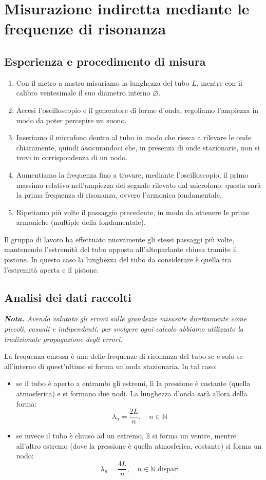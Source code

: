 \documentclass{article}
\newcommand*{\diam}{\varnothing}
\begin{document}
\pagebreak
\section{Misurazione indiretta mediante le frequenze di risonanza}

\subsection{Esperienza e procedimento di misura}

\begin{enumerate}
  \item
    Con il metro a nastro misuriamo la lunghezza del tubo $L$,
    mentre con il calibro ventesimale il suo diametro interno
    $\diam$.
  \item
    Accesi l'oscilloscopio e il generatore di forme d'onda,
    regoliamo l'ampiezza in modo da poter percepire un suono.
  \item
    Inseriamo il microfono dentro al tubo in modo che riesca a rilevare le onde
    chiaramente, quindi assicurandoci che, in presenza di onde stazionarie,
    non si trovi in corrispondenza di un nodo.
  \item
    Aumentiamo la frequenza fino a trovare, mediante l'oscilloscopio,
    il primo massimo relativo nell'ampiezza del segnale rilevato dal
    microfono: questa sarà la prima frequenza di risonanza,
    ovvero l'armonica fondamentale.
  \item
    Ripetiamo più volte il passaggio precedente, in modo da ottenere le prime
    armoniche (multiple della fondamentale).
\end{enumerate}
Il gruppo di lavoro ha effettuato nuovamente gli stessi passaggi più volte,
mantenendo l'estremità del tubo opposta all'altoparlante chiusa tramite il pistone.
In questo caso la lunghezza del tubo da considerare è quella tra l'estremità
aperta e il pistone.

\subsection{Analisi dei dati raccolti}
\emph{\textbf{Nota.}
Avendo valutato gli errori sulle grandezze misurate direttamente
come piccoli, casuali e indipendenti, per svolgere ogni calcolo
abbiamo utilizzato la tradizionale propagazione degli errori.
}
\vspace{2mm}

La frequenza emessa è una delle frequenze di risonanza del tubo se e solo se
all'interno di quest'ultimo si forma un'onda stazionaria. In tal caso:
\begin{itemize}
  \item se il tubo è aperto a entrambi gli estremi,
    lì la pressione è costante (quella atmosferica) e si formano due nodi.
    La lunghezza d'onda sarà allora della forma:
    \[ \lambda_n = \frac{2L}{n},\quad n\in\mathbb{N} \]
  \item se invece il tubo è chiuso ad un estremo,
    lì si forma un ventre, mentre all'altro estremo (dove la pressione è
    quella atmosferica, costante) si forma un nodo:
    \[ \lambda_n = \frac{4L}{n},\quad n\in\mathbb{N}\;\text{dispari} \]
\end{itemize}
\end{document}
